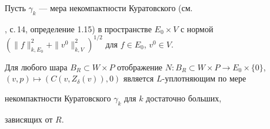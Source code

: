 Пусть $\gamma_k$ --- мера некомпактности Куратовского (см.


\cite{AKP}, с.\,14, определение 1.15) в пространстве $E_0 \times


V$ с нормой $(\|f\|_{k,E_0}^2+\|v^0\|_{k,V}^2)^{1/2}$ для $f \in


E_0$, $v^0 \in V$.





\begin{thms}\label{t32}


Для любого шара $B_R \subset W \times P$ отображение $N: B_R


\subset W \times P \to E_0 \times \{0\}$, $(v,p)\mapsto


(C(v,Z_{\delta}(v)),0)$ является $L$-уплотняющим по мере


некомпактности Куратовского $\gamma_k$ для $k$ достаточно больших,


зависящих от $R$.


\end{thms}





